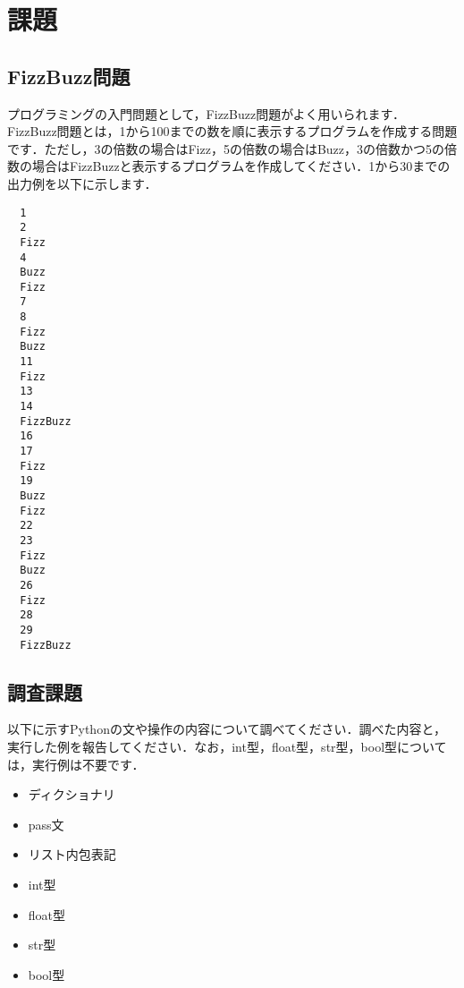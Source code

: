 \documentclass{jarticle}
\begin{document}
\section{課題}
\subsection{FizzBuzz問題}
プログラミングの入門問題として，FizzBuzz問題がよく用いられます．
FizzBuzz問題とは，1から100までの数を順に表示するプログラムを作成する問題です．ただし，3の倍数の場合はFizz，5の倍数の場合はBuzz，3の倍数かつ5の倍数の場合はFizzBuzzと表示するプログラムを作成してください．1から30までの出力例を以下に示します．
\begin{verbatim}
  1
  2
  Fizz
  4
  Buzz
  Fizz
  7
  8
  Fizz
  Buzz
  11
  Fizz
  13
  14
  FizzBuzz
  16
  17
  Fizz
  19
  Buzz
  Fizz
  22
  23
  Fizz
  Buzz
  26
  Fizz
  28
  29
  FizzBuzz
\end{verbatim}

\subsection{調査課題}
以下に示すPythonの文や操作の内容について調べてください．調べた内容と，実行した例を報告してください．なお，int型，float型，str型，bool型については，実行例は不要です．
\begin{itemize}
  \item ディクショナリ
  \item pass文
  \item リスト内包表記
  \item int型
  \item float型
  \item str型
  \item bool型
\end{itemize}
\end{document}
